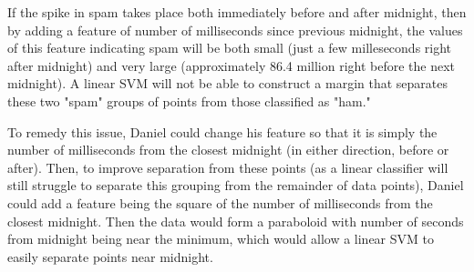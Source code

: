 \documentclass{report}
\begin{document}
If the spike in spam takes place both immediately before and after midnight, then by adding a feature of number of milliseconds since previous midnight, the values of this feature indicating spam will be both small (just a few milleseconds right after midnight) and very large (approximately 86.4 million right before the next midnight). A linear SVM will not be able to construct a margin that separates these two "spam" groups of points from those classified as "ham." 

To remedy this issue, Daniel could change his feature so that it is simply the number of milliseconds from the closest midnight (in either direction, before or after). Then, to improve separation from these points (as a linear classifier will still struggle to separate this grouping from the remainder of data points), Daniel could add a feature being the square of the number of milliseconds from the closest midnight. Then the data would form a paraboloid with number of seconds from midnight being near the minimum, which would allow a linear SVM to easily separate points near midnight. 
\end{document}
